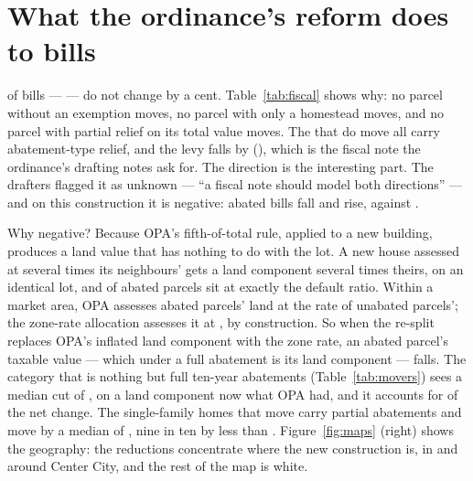 \documentclass[11pt]{article}
\begin{document}
\section{What the ordinance's reform does to bills}\label{sec:resplit}

\begin{table}[t]
  \centering
  \caption{The re-split, by kind of exemption. With the total and the rate held fixed, only an
  exemption that depends on the land/building split can change a bill. Net change at the
  unchanged rate of \LycdMillage{} mills.}
  \label{tab:fiscal}
  
\end{table}

\LycdCUnchangedParcels{} of \LycdBilledParcels{} bills --- \LycdCUnmovedPct{} --- do not change by
a cent. Table~\ref{tab:fiscal} shows why: no parcel without an exemption moves, no parcel with
only a homestead moves, and no parcel with partial relief on its total value moves. The
\LycdCMoved{} that do move all carry abatement-type relief, and the levy falls by \LycdCLevyAbsM{}
(\LycdCLevyPct{}), which is the fiscal note the ordinance's drafting notes ask for. The direction
is the interesting part. The drafters flagged it as unknown --- ``a fiscal note should model
both directions'' --- and on this construction it is negative: \LycdCDown{} abated bills fall and
\LycdCUp{} rise, \LycdCDownM{} against \LycdCUpM{}.

\begin{table}[t]
  \centering
  \caption{Where the re-split lands. Parcels whose bill moves, by property type; the last
  column is the median ratio of the new land component to OPA's, over those parcels.}
  \label{tab:movers}
  
\end{table}

Why negative? Because OPA's fifth-of-total rule, applied to a new building, produces a land
value that has nothing to do with the lot. A new house assessed at several times its
neighbours' gets a land component several times theirs, on an identical lot, and
\LycdAbatedAtDefaultPct{} of abated parcels sit at exactly the default ratio. Within a market
area, OPA assesses abated parcels' land at \LycdUniOPAAbatedRatio{} the rate of unabated
parcels'; the zone-rate allocation assesses it at \LycdUniLYCDAbatedRatio{}, by construction. So
when the re-split replaces OPA's inflated land component with the zone rate, an abated parcel's
taxable value --- which under a full abatement is its land component --- falls. The category
that is nothing but full ten-year abatements (Table~\ref{tab:movers}) sees a median cut of
\LycdCAbatedMedianAbsPct{}, on a land component now \LycdCAbatedLandRatio{} what OPA had, and it
accounts for \LycdCAbatedShareOfNet{} of the net change. The \LycdCSfrMoved{} single-family
homes that move carry partial abatements and move by a median of \LycdCSfrMedianAbs{}, nine in
ten by less than \LycdCSfrNinetiethAbs{}. Figure~\ref{fig:maps} (right) shows the geography: the
reductions concentrate where the new construction is, in and around Center City, and the rest
of the map is white.
\end{document}
